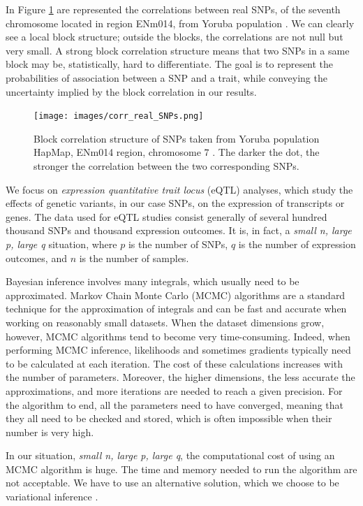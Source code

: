\documentclass[a4paper, 11pt]{report}
\numberwithin{equation}{chapter}
\begin{document}
In Figure \ref{fig:corr} are represented the correlations between real SNPs, of the seventh chromosome located in region ENm014, from Yoruba population \citep[HapMap project][]{hapmap}. We can clearly see a local block structure; outside the blocks, the correlations are not null but very small. A strong block correlation structure means that two SNPs in a same block may be, statistically, hard to differentiate. The goal is to represent the probabilities of association between a SNP and a trait, while conveying the uncertainty implied by the block correlation in our results.

\begin{figure}[h!]
\texttt{[image: images/corr\_real\_SNPs.png]}
\caption{\label{fig:corr} Block correlation structure of SNPs taken from Yoruba population HapMap, ENm014 region, chromosome $7$ \citep{hapmap}. The darker the dot, the stronger the correlation between the two corresponding SNPs.}
\end{figure}

We focus on \textit{expression quantitative trait locus} (eQTL) analyses, which study the effects of genetic variants, in our case SNPs, on the expression of transcripts or genes. The data used for eQTL studies consist generally of several hundred thousand SNPs and thousand expression outcomes. It is, in fact, a \textit{small n, large p, large q} situation, where $p$ is the number of SNPs, $q$ is the number of expression outcomes, and $n$ is the number of samples.

Bayesian inference involves many integrals, which usually need to be approximated. Markov Chain Monte Carlo (MCMC) algorithms are a standard technique for the approximation of integrals and can be fast and accurate when working on reasonably small datasets. When the dataset dimensions grow, however, MCMC algorithms tend to become very time-consuming. Indeed, when performing MCMC inference, likelihoods and sometimes gradients typically need to be calculated at each iteration. The cost of these calculations increases with the number of parameters. Moreover, the higher dimensions, the less accurate the approximations, and more iterations are needed to reach a given precision. For the algorithm to end, all the parameters need to have converged, meaning that they all need to be checked and stored, which is often impossible when their number is very high.

In our situation, \textit{small n, large p, large q}, the computational cost of using an MCMC algorithm is huge. The time and memory needed to run the algorithm are not acceptable. We have to use an alternative solution, which we choose to be variational inference \citep{varInf}. 
\end{document}
